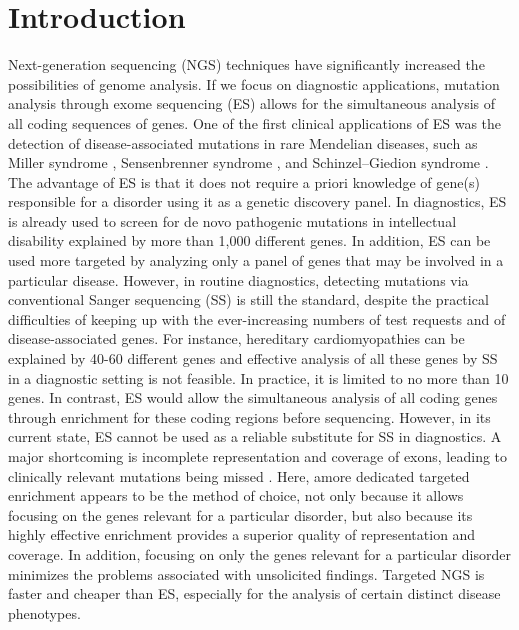 \section{Introduction}\label{introduction}
Next-generation sequencing (NGS) techniques have significantly increased the possibilities of genome analysis. 
If we focus on diagnostic applications, mutation analysis through exome sequencing (ES) allows for the simultaneous analysis of all coding sequences of genes. 
One of the first clinical applications of ES was the detection of disease-associated mutations in rare Mendelian diseases, such as Miller syndrome \cite{Ng_2009}, Sensenbrenner syndrome \cite{Gilissen_2010}, and Schinzel–Giedion syndrome \cite{Hoischen_2010}. 
The advantage of ES is that it does not require a priori knowledge of gene(s) responsible for a disorder using it as a genetic discovery panel. 
In diagnostics, ES is already used to screen for de novo pathogenic mutations in intellectual disability \cite{de_Ligt_2012} explained by more than 1,000 different genes. 
In addition, ES can be used more targeted by analyzing only a panel of genes that may be involved in a particular disease. 
However, in routine diagnostics, detecting mutations via conventional Sanger sequencing (SS) is still the standard, despite the practical difficulties of keeping up with the ever-increasing numbers of test requests and of disease-associated genes. 
For instance, hereditary cardiomyopathies can be explained by 40-60 different genes \cite{Jongbloed_2011,Norton_2012} and effective analysis of all these genes by SS in a diagnostic setting is not feasible. 
In practice, it is limited to no more than 10 genes. 
In contrast, ES would allow the simultaneous analysis of all coding genes through enrichment for these coding regions before sequencing. 
However, in its current state, ES cannot be used as a reliable substitute for SS in diagnostics. 
A major shortcoming is incomplete representation and coverage of exons, leading to clinically relevant mutations being missed \cite{Gilissen_2010,Sulonen_2011}. 
Here, amore dedicated targeted enrichment appears to be the method of choice, not only because it allows focusing on the genes relevant for a particular disorder, but also because its highly effective enrichment provides a superior quality of representation and coverage. 
In addition, focusing on only the genes relevant for a particular disorder minimizes the problems associated with unsolicited findings. 
Targeted NGS is faster and cheaper than ES, especially for the analysis of certain distinct disease phenotypes. 
